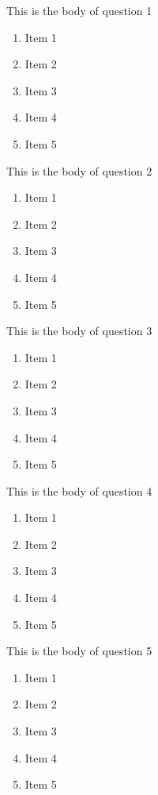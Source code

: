 \documentclass{article}
\begin{document}
This is the body of question 1
\begin{enumerate}
    \item
    Item 1
    \item
    Item 2
    \item
    Item 3
    \item
    Item 4
    \item
    Item 5
\end{enumerate}




This is the body of question 2
\begin{enumerate}
    \item
    Item 1
    \item
    Item 2
    \item
    Item 3
    \item
    Item 4
    \item
    Item 5
\end{enumerate}


This is the body of question 3
\begin{enumerate}
    \item
    Item 1
    \item
    Item 2
    \item
    Item 3
    \item
    Item 4
    \item
    Item 5
\end{enumerate}



This is the body of question 4
\begin{enumerate}
    \item
    Item 1
    \item
    Item 2
    \item
    Item 3
    \item
    Item 4
    \item
    Item 5
\end{enumerate}


This is the body of question 5
\begin{enumerate}
    \item
    Item 1
    \item
    Item 2
    \item
    Item 3
    \item
    Item 4
    \item
    Item 5
\end{enumerate}
\end{document}
